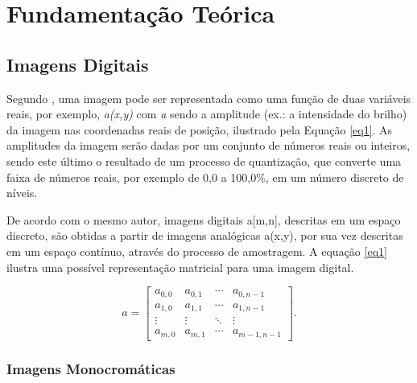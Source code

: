 \chapter[Fundamentação Teórica]{Fundamentação Teórica}

\section{Imagens Digitais}

Segundo \cite{young1998fundamentals}, uma imagem pode ser representada como uma função de duas variáveis reais, por exemplo, \textit{a(x,y)} com \textit{a} sendo a amplitude (ex.: a intensidade do brilho) da imagem nas coordenadas reais de posição, ilustrado pela Equação \ref{eq1}. As amplitudes da imagem serão dadas por um conjunto de números reais ou inteiros, sendo este último o resultado de um processo de quantização, que converte uma faixa de números reais, por exemplo de 0,0 a 100,0\%, em um número discreto de níveis.

De acordo com o mesmo autor, imagens digitais a[m,n], descritas em um espaço discreto, são obtidas a partir de imagens analógicas a(x,y), por sua vez descritas em um espaço contínuo,  através do processo de amostragem. A equação \ref{eq1} ilustra uma possível representação matricial para uma imagem digital.
\vspace{-1cm}
\begin{center}
	\begin{equation}
	a =
	\begin{bmatrix}
  		a_{0,0} & a_{0,1} & \cdots & a_{0,n-1} \\
  		a_{1,0} & a_{1,1} & \cdots & a_{1,n-1} \\
  		\vdots  & \vdots  & \ddots & \vdots  \\
  		a_{m,0} & a_{m,1} & \cdots & a_{m-1,n-1}
	\end{bmatrix}.
	\label{eq1} 
	\end{equation}
\end{center}


\subsection{Imagens Monocromáticas}
	
